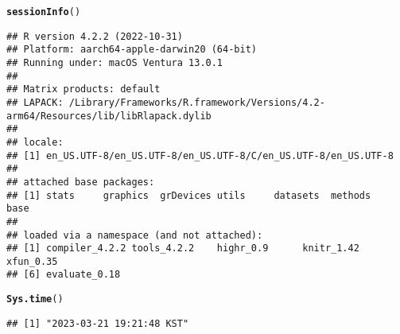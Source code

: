 \documentclass{article}\usepackage[]{graphicx}\usepackage[]{xcolor}
\makeatletter
\newcommand{\hlstd}[1]{\textcolor[rgb]{0.345,0.345,0.345}{#1}}%
\newcommand{\hlkwd}[1]{\textcolor[rgb]{0.737,0.353,0.396}{\textbf{#1}}}%
\newenvironment{kframe}{%
 \def\at@end@of@kframe{}%
 \ifinner\ifhmode%
  \def\at@end@of@kframe{\end{minipage}}%
  \begin{minipage}{\columnwidth}%
 \fi\fi%
 \def\FrameCommand##1{\hskip\@totalleftmargin \hskip-\fboxsep
 \colorbox{shadecolor}{##1}\hskip-\fboxsep
     \hskip-\linewidth \hskip-\@totalleftmargin \hskip\columnwidth}%
 \MakeFramed {\advance\hsize-\width
   \@totalleftmargin\z@ \linewidth\hsize
   \@setminipage}}%
 {\par\unskip\endMakeFramed%
 \at@end@of@kframe}
\newenvironment{knitrout}{}{} %
\makeatother
\begin{document}
\begin{knitrout}
\color{fgcolor}\begin{kframe}
\begin{alltt}
\hlkwd{sessionInfo}\hlstd{()}
\end{alltt}
\begin{verbatim}
## R version 4.2.2 (2022-10-31)
## Platform: aarch64-apple-darwin20 (64-bit)
## Running under: macOS Ventura 13.0.1
## 
## Matrix products: default
## LAPACK: /Library/Frameworks/R.framework/Versions/4.2-arm64/Resources/lib/libRlapack.dylib
## 
## locale:
## [1] en_US.UTF-8/en_US.UTF-8/en_US.UTF-8/C/en_US.UTF-8/en_US.UTF-8
## 
## attached base packages:
## [1] stats     graphics  grDevices utils     datasets  methods   base     
## 
## loaded via a namespace (and not attached):
## [1] compiler_4.2.2 tools_4.2.2    highr_0.9      knitr_1.42     xfun_0.35     
## [6] evaluate_0.18
\end{verbatim}
\begin{alltt}
\hlkwd{Sys.time}\hlstd{()}
\end{alltt}
\begin{verbatim}
## [1] "2023-03-21 19:21:48 KST"
\end{verbatim}
\end{kframe}
\end{knitrout}
\end{document}
